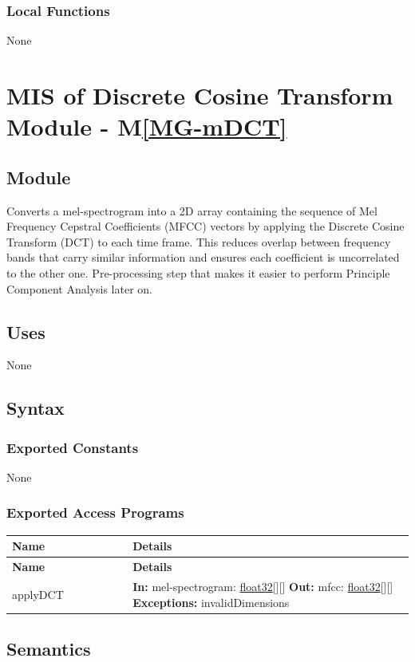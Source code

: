 \documentclass[12pt, titlepage]{article}
\newcommand{\mref}[1]{M\ref{#1}}
\newenvironment{apitable}{%
\begin{center}
\begin{longtable}{|p{0.3\linewidth}|p{0.7\linewidth}|} 
\hline
\textbf{Name} & \textbf{Details} \\
\hline
\endfirsthead
\hline
\textbf{Name} & \textbf{Details} \\
\hline
\endhead
\hline
\endfoot
\hline
\endlastfoot
}{%
\end{longtable}
\end{center}
}
\newcommand{\apifunc}[4]{%
#1 & 
\textbf{In:} #2 \newline
\textbf{Out:} #3 \newline
\textbf{Exceptions:} #4 \\
\hline
}
\begin{document}
\subsubsection{Local Functions}

None

\newpage 

\section{MIS of Discrete Cosine Transform Module \label{mod:DCT} -
\mref{MG-mDCT}}

\subsection{Module}

Converts a mel-spectrogram into a 2D array containing the sequence of Mel
Frequency Cepstral Coefficients (MFCC) vectors by applying the Discrete Cosine
Transform (DCT) to each time frame. This reduces overlap between frequency bands
that carry similar information and ensures each coefficient is uncorrelated to
the other one. Pre-processing step that makes it easier to perform Principle
Component Analysis later on. 

\subsection{Uses}

None

\subsection{Syntax}

\subsubsection{Exported Constants}

None

\subsubsection{Exported Access Programs}
\begin{apitable}
  \apifunc{applyDCT}
    {mel-spectrogram: \hyperref[generic:float32]{float32}[][]}
    {mfcc: \hyperref[generic:float32]{float32}[][]}
    {invalidDimensions}
\end{apitable}

\subsection{Semantics}
\end{document}
